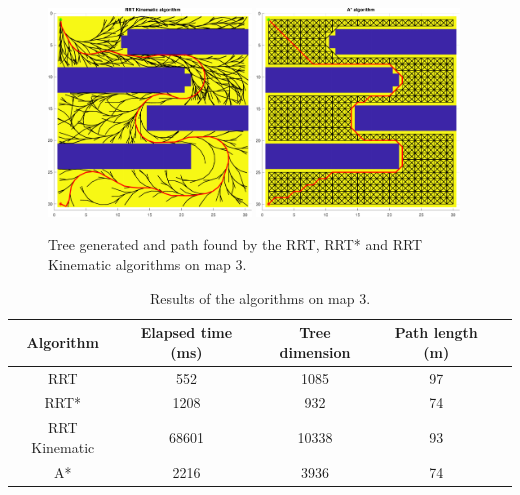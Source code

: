 \begin{figure}[H]
    \includegraphics[width=0.48\textwidth]{./img/MATLAB/testing/03_RRT Kinematic.pdf}
    \hspace{6pt}
    \includegraphics[width=0.48\textwidth]{./img/MATLAB/testing/03_A.pdf}
    \caption{Tree generated and path found by the RRT, RRT* and RRT Kinematic algorithms on map 3.}
    \label{fig:map_3_results}
\end{figure}

\begin{table}[H]
    \centering
    \begin{tabular}{|c|c|c|c|c|}
        \hline
        \textbf{Algorithm} & \textbf{Elapsed time (ms)} & \textbf{Tree dimension} & \textbf{Path length (m)} \\
        \hline
        RRT                & 552                        & 1085                    & 97                       \\
        RRT*               & 1208                       & 932                     & 74                       \\
        RRT Kinematic      & 68601                      & 10338                   & 93                       \\
        \hline
        A*                 & 2216                       & 3936                    & 74                       \\
        \hline
    \end{tabular}
    \caption{Results of the algorithms on map 3.}
    \label{tab:map_3_results}
\end{table}

